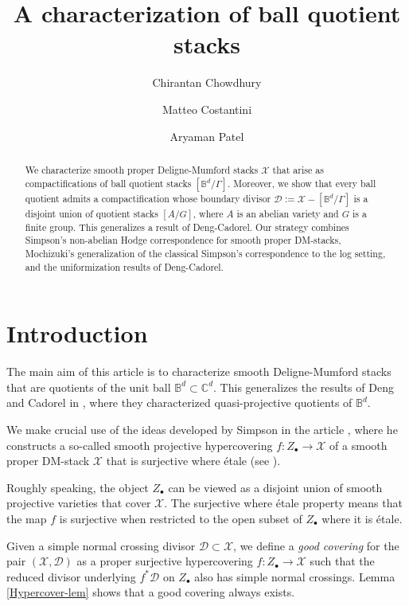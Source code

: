 \documentclass[a4paper]{amsart}
\title[A characterization of ball quotient stacks]{A characterization of ball quotient stacks}
\author{Chirantan Chowdhury}
\author{Matteo Costantini}
\author{Aryaman Patel}
\theoremstyle{definition}
\begin{document}
\begin{abstract}
We characterize smooth proper Deligne-Mumford stacks $\mathscr{X}$ that arise as compactifications of ball quotient stacks $[\mathbb{B}^d/\Gamma]$. Moreover, we show that every ball quotient admits a compactification whose boundary divisor $\mathscr{D}:=\mathscr{X}-[\mathbb{B}^d/\Gamma]$ is a disjoint union of quotient stacks $[A/G]$, where $A$ is an abelian variety and $G$ is a finite group. This generalizes a result of Deng-Cadorel. Our strategy combines Simpson's non-abelian Hodge correspondence for smooth proper DM-stacks, Mochizuki's generalization of the classical Simpson's correspondence to the log setting, and the uniformization results of Deng-Cadorel.
\end{abstract}

\maketitle

\section{Introduction}

The main aim of this article is to characterize smooth Deligne-Mumford stacks that are quotients of the unit ball $\mathbb{B}^d\subset\mathbb{C}^d$. This generalizes the results of Deng and Cadorel in \cite{dengcadorel}, where they characterized quasi-projective quotients of $\mathbb{B}^d$.

We make crucial use of the ideas developed by Simpson in the article \cite{simpsonstacks}, where he constructs a so-called smooth projective hypercovering $f:Z_\bullet\to\mathscr{X}$ of a smooth proper DM-stack $\mathscr{X}$ that is surjective where \'etale (see \cite[Section 5]{simpsonstacks}). 

Roughly speaking, the object $Z_\bullet$ can be viewed as a disjoint union of smooth projective varieties that cover $\mathscr{X}$. The surjective where \'etale property means that the map $f$ is surjective when restricted to the open subset of $Z_\bullet$ where it is \'etale. 

Given a simple normal crossing divisor $\mathscr{D}\subset\mathscr{X}$, we define a \emph{good covering} for the pair $(\mathscr{X},\mathscr{D})$ as a proper surjective hypercovering $f:Z_\bullet\to\mathscr{X}$ such that the reduced divisor underlying $f^*\mathscr{D}$ on $Z_\bullet$ also has simple normal crossings. Lemma \ref{Hypercover-lem} shows that a good covering always exists.
\end{document}
